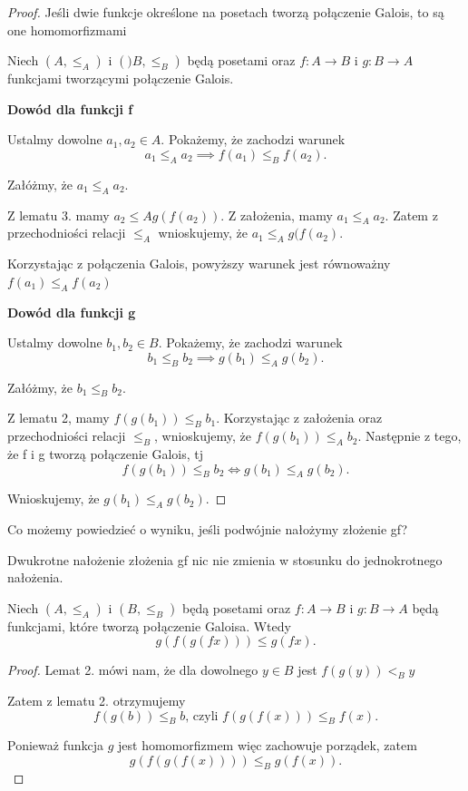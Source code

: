 \begin{proof}{Jeśli dwie funkcje określone na posetach tworzą połączenie Galois, to są one homomorfizmami}
	
	Niech $\left( A, \le _A \right) $ i $\left( )B, \le _B \right) $ będą posetami oraz $f: A \rightarrow B$ i $g: B \rightarrow A$ funkcjami tworzącymi połączenie Galois.

	\textbf{Dowód dla funkcji f} 

	Ustalmy dowolne $a_1,a_2 \in A$. Pokażemy, że zachodzi warunek
	\[
	a_1 \le _A a_2 \implies f(a_1) \le _B f(a_2)
	.\] 
	
	Załóżmy, że $a_1\le _A a_2$.

	Z lematu 3. mamy $a_2 \le A g(f(a_2))$. Z założenia, mamy $a_1 \le_A a_2$. Zatem z przechodniości relacji $\le _A$ wnioskujemy, że $a_1 \le _A g(f(a_2)$. 

Korzystając z połączenia Galois, powyższy warunek jest równoważny $f(a_1) \le _A f(a_2)$

\textbf{Dowód dla funkcji g}

	Ustalmy dowolne $b_1,b_2 \in B$. Pokażemy, że zachodzi warunek
	\[
	b_1\le _B b_2 \implies g(b_1) \le _A g(b_2)
	.\] 

	Załóżmy, że $b_1\le _B b_2$. 

	Z lematu 2, mamy $f(g(b_1)) \le _B b_1$. Korzystając z założenia oraz przechodniości relacji $\le _B$, wnioskujemy, że $f(g(b_1)) \le _A b_2$. Następnie z tego, że f i g tworzą połączenie Galois, tj
	\[
	f(g(b_1)) \le_B b_2 \iff g(b_1) \le_A g(b_2)
	.\] 

	Wnioskujemy, że $g(b_1) \le _A g(b_2)$.
\end{proof}
Co możemy powiedzieć o wyniku, jeśli podwójnie nałożymy złożenie gf?

Dwukrotne nałożenie złożenia gf nic nie zmienia w stosunku do jednokrotnego nałożenia.
\begin{lemma}
	Niech $(A, \le _A)$ i $(B, \le _B)$ będą posetami oraz $f: A \rightarrow B$ i $g: B \rightarrow A$ będą funkcjami, które tworzą połączenie Galoisa. Wtedy
	\[
	g(f(g(f x))) \le  g (f x)
	.\] 
\end{lemma}
\begin{proof}

	Lemat 2. mówi nam, że dla dowolnego $y\in B$ jest $f(g(y)) <_B y$

	Zatem z lematu 2. otrzymujemy
	\[
	f(g(b)) \le _B b \text{, czyli } f(g(f(x))) \le _B f(x)
	.\] 

Ponieważ funkcja $g$ jest homomorfizmem więc zachowuje porządek, zatem \[
g(f(g(f(x)))) \le _B g(f (x))
.\] 
\end{proof}

